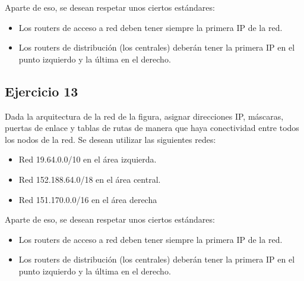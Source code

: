 \documentclass[letterpaper,10pt,spanish]{sphinxmanual}
\begin{document}
\begin{figure}[htbp]
\centering

\noindent{}
\end{figure}

\sphinxAtStartPar
Aparte de eso, se desean respetar unos ciertos estándares:
\begin{itemize}
\item {} 
\sphinxAtStartPar
Los routers de acceso a red deben tener siempre la primera IP de la red.

\item {} 
\sphinxAtStartPar
Los routers de distribución (los centrales) deberán tener la primera IP en el punto izquierdo y la última en el derecho.

\end{itemize}


\subsection{Ejercicio 13}
\label{\detokenize{t2_integracion_elementos/ejercicios_subredes_ipv4/ejercicios_dos_router:ejercicio-13}}
\sphinxAtStartPar
Dada la arquitectura de la red de la figura, asignar direcciones IP, máscaras, puertas de enlace y tablas de rutas de manera que haya conectividad entre todos
los nodos de la red. Se desean utilizar las siguientes redes:
\begin{itemize}
\item {} 
\sphinxAtStartPar
Red 19.64.0.0/10 en el área izquierda.

\item {} 
\sphinxAtStartPar
Red 152.188.64.0/18 en el área central.

\item {} 
\sphinxAtStartPar
Red 151.170.0.0/16 en el área derecha

\end{itemize}

\begin{figure}[htbp]
\centering

\noindent{}
\end{figure}

\sphinxAtStartPar
Aparte de eso, se desean respetar unos ciertos estándares:
\begin{itemize}
\item {} 
\sphinxAtStartPar
Los routers de acceso a red deben tener siempre la primera IP de la red.

\item {} 
\sphinxAtStartPar
Los routers de distribución (los centrales) deberán tener la primera IP en el punto izquierdo y la última en el derecho.

\end{itemize}
\end{document}
